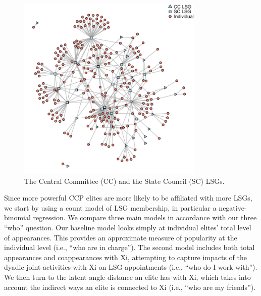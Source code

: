 \documentclass[11pt,english]{article}
\begin{document}
\begin{flushleft}
\noindent \begin{center}
\begin{figure}[H]
\noindent \begin{centering}
\includegraphics[width=3.5in]{LSG_full}
\par\end{centering}
\caption{The Central Committee (CC) and the State Council (SC) LSGs.}
\label{fig:lsgNet}
\end{figure}
\par\end{center}

Since more powerful CCP elites are more likely to be affiliated with more LSGs, we start by using a count model of LSG membership, in particular a negative-binomial regression. We compare three main models in accordance with our three ``who'' question. Our baseline model looks simply at individual elites' total level of appearances. This provides an approximate measure of popularity at the individual level (i.e., ``who are in charge''). The second model includes both total appearances and coappearances with Xi, attempting to capture impacts of the dyadic joint activities with Xi on LSG appointments (i.e., ``who do I work with''). We then turn to the latent angle distance an elite has with Xi, which takes into account the indirect ways an elite is connected to Xi (i.e., ``who are my friends'').


\end{flushleft}
\end{document}
